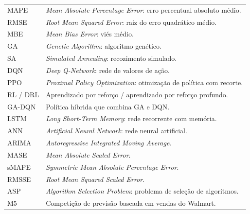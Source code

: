 \begin{longtable}{@{}p{3cm}p{11.5cm}@{}}
MAPE & \textit{Mean Absolute Percentage Error}: erro percentual absoluto médio.\\
RMSE & \textit{Root Mean Squared Error}: raiz do erro quadrático médio.\\
MBE & \textit{Mean Bias Error}: viés médio.\\
GA & \textit{Genetic Algorithm}: algoritmo genético.\\
SA & \textit{Simulated Annealing}: recozimento simulado.\\
DQN & \textit{Deep Q-Network}: rede de valores de ação.\\
PPO & \textit{Proximal Policy Optimization}: otimização de política com recorte.\\
RL / DRL & Aprendizado por reforço / aprendizado por reforço profundo.\\
GA-DQN & Política híbrida que combina GA e DQN.\\
LSTM & \textit{Long Short-Term Memory}: rede recorrente com memória.\\
ANN & \textit{Artificial Neural Network}: rede neural artificial.\\
ARIMA & \textit{Autoregressive Integrated Moving Average}.\\
MASE & \textit{Mean Absolute Scaled Error}.\\
sMAPE & \textit{Symmetric Mean Absolute Percentage Error}.\\
RMSSE & \textit{Root Mean Squared Scaled Error}.\\
ASP & \textit{Algorithm Selection Problem}: problema de seleção de algoritmos.\\
M5 & Competição de previsão baseada em vendas do Walmart.\\
\bottomrule
\end{longtable}
\endgroup
\newpage\lhead{\rightmark}
